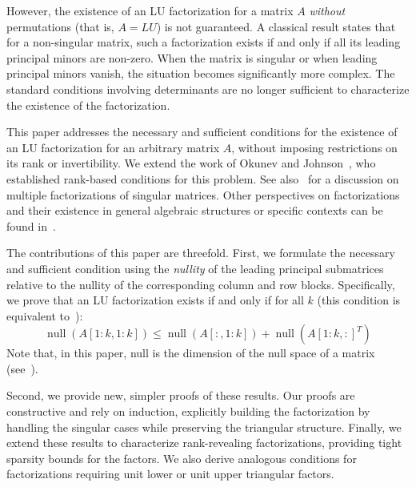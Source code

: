 \documentclass[10pt,twoside]{siamart1116}
\DeclareMathOperator{\nl}{null}
\numberwithin{theorem}{section}
\begin{document}
However, the existence of an LU factorization for a matrix $A$ \emph{without} permutations (that is, $A = LU$) is not guaranteed. A classical result states that for a non-singular matrix, such a factorization exists if and only if all its leading principal minors are non-zero. When the matrix is singular or when leading principal minors vanish, the situation becomes significantly more complex. The standard conditions involving determinants are no longer sufficient to characterize the existence of the factorization.

This paper addresses the necessary and sufficient conditions for the existence of an LU factorization for an arbitrary matrix $A$, without imposing restrictions on its rank or invertibility. We extend the work of Okunev and Johnson~\cite{okunev_necessary_2005}, who established rank-based conditions for this problem. See also~\cite{dopico_multiple_2006} for a discussion on multiple factorizations of singular matrices. Other perspectives on factorizations and their existence in general algebraic structures or specific contexts can be found in~\cite{nagarajan_products_1999,johnson_inherited_1989,jeffrey_lu_2010,higham_gaussian_2011}.

The contributions of this paper are threefold. First, we formulate the necessary and sufficient condition using the \emph{nullity} of the leading principal submatrices relative to the nullity of the corresponding column and row blocks. Specifically, we prove that an LU factorization exists if and only if for all $k$ (this condition is equivalent to~\cite{okunev_necessary_2005}):
\[
	\nl(A[1:k,1:k]) \le \nl(A[:,1:k]) + \nl({A[1:k,:]}^T)
\]
Note that, in this paper, null is the dimension of the null space of a matrix (see~).

Second, we provide new, simpler proofs of these results. Our proofs are constructive and rely on induction, explicitly building the factorization by handling the singular cases while preserving the triangular structure. Finally, we extend these results to characterize rank-revealing factorizations, providing tight sparsity bounds for the factors. We also derive analogous conditions for factorizations requiring unit lower or unit upper triangular factors.
\end{document}
